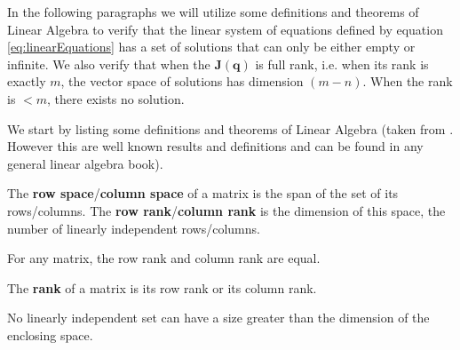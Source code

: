 In the following paragraphs we will utilize some definitions and theorems of Linear Algebra to verify that the linear system of equations defined by equation \ref{eq:linearEquations} has a set of solutions that can only be either empty or infinite. We also verify that when the ${\mathbf{J}(\mathbf{{q}})}$ is full rank, i.e. when its rank is exactly $m$, the vector space of solutions has dimension $(m-n)$. When the rank is $<m$, there exists no solution.

We start by listing some definitions and theorems of Linear Algebra (taken from \cite{hefferonlinear}. However this are well known results and definitions and can be found in any general linear algebra book).



\begin{definition}
The \textbf{row space}/\textbf{column space} of a matrix is the span of the set of its rows/columns. The \textbf{row rank}/\textbf{column rank} is the dimension of this space, the number of linearly independent rows/columns.
\end{definition}

\begin{theorem}
For any matrix, the row rank and column rank are equal.
\end{theorem}

\begin{definition}
The \textbf{rank} of a matrix is its row rank or its column rank.
\end{definition}

\begin{theorem}
No linearly independent set can have a size greater than the dimension of the enclosing space.
\end{theorem}

